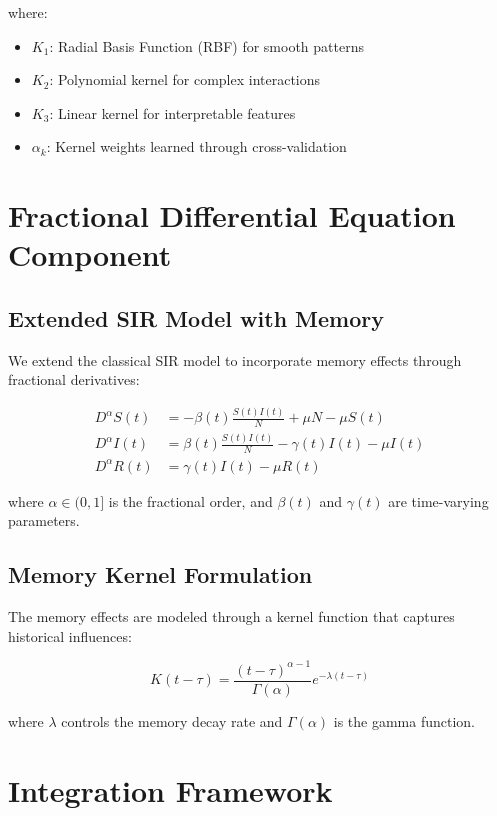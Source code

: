 \documentclass[12pt,a4paper]{report}
\begin{document}
where:
\begin{itemize}
    \item $K_1$: Radial Basis Function (RBF) for smooth patterns
    \item $K_2$: Polynomial kernel for complex interactions
    \item $K_3$: Linear kernel for interpretable features
    \item $\alpha_k$: Kernel weights learned through cross-validation
\end{itemize}

\section{Fractional Differential Equation Component}

\subsection{Extended SIR Model with Memory}

We extend the classical SIR model to incorporate memory effects through fractional derivatives:

\begin{align}
D^\alpha S(t) &= -\beta(t) \frac{S(t)I(t)}{N} + \mu N - \mu S(t) \\
D^\alpha I(t) &= \beta(t) \frac{S(t)I(t)}{N} - \gamma(t) I(t) - \mu I(t) \\
D^\alpha R(t) &= \gamma(t) I(t) - \mu R(t)
\end{align}

where $\alpha \in (0,1]$ is the fractional order, and $\beta(t)$ and $\gamma(t)$ are time-varying parameters.

\subsection{Memory Kernel Formulation}

The memory effects are modeled through a kernel function that captures historical influences:

\begin{equation}
K(t-\tau) = \frac{(t-\tau)^{\alpha-1}}{\Gamma(\alpha)}e^{-\lambda(t-\tau)}
\end{equation}

where $\lambda$ controls the memory decay rate and $\Gamma(\alpha)$ is the gamma function.

\section{Integration Framework}
\end{document}
